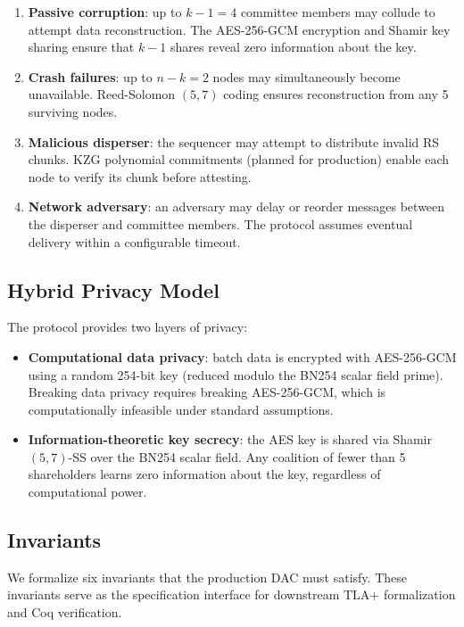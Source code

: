 \begin{enumerate}
  \item \textbf{Passive corruption}: up to $k - 1 = 4$ committee
    members may collude to attempt data reconstruction. The AES-256-GCM
    encryption and Shamir key sharing ensure that $k - 1$ shares reveal
    zero information about the key.
  \item \textbf{Crash failures}: up to $n - k = 2$ nodes may
    simultaneously become unavailable. Reed-Solomon $(5,7)$ coding
    ensures reconstruction from any 5 surviving nodes.
  \item \textbf{Malicious disperser}: the sequencer may attempt to
    distribute invalid RS chunks. KZG polynomial commitments (planned
    for production) enable each node to verify its chunk before attesting.
  \item \textbf{Network adversary}: an adversary may delay or reorder
    messages between the disperser and committee members. The protocol
    assumes eventual delivery within a configurable timeout.
\end{enumerate}

\subsection{Hybrid Privacy Model}

The protocol provides two layers of privacy:

\begin{itemize}
  \item \textbf{Computational data privacy}: batch data is encrypted
    with AES-256-GCM using a random 254-bit key (reduced modulo the
    BN254 scalar field prime). Breaking data privacy requires breaking
    AES-256-GCM, which is computationally infeasible under standard
    assumptions.
  \item \textbf{Information-theoretic key secrecy}: the AES key is
    shared via Shamir $(5,7)$-SS over the BN254 scalar field. Any
    coalition of fewer than 5 shareholders learns zero information about
    the key, regardless of computational power.
\end{itemize}

\subsection{Invariants}
\label{sec:invariants}

We formalize six invariants that the production DAC must satisfy. These
invariants serve as the specification interface for downstream TLA+
formalization and Coq verification.

